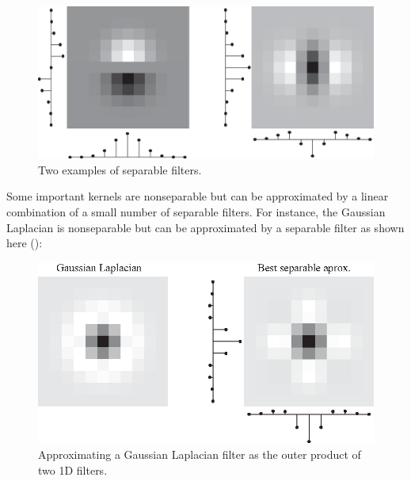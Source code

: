 \begin{figure}[h]
\centerline{
    \includegraphics[width=.6\linewidth]{./figures/convolutional_neural_nets/kernels_separable_aprox.eps}}
    \caption{Two examples of separable filters.}
    \label{fig:convolutional_neural_nets:kernels_separable_aprox}
\end{figure}
\vspace{-0.4cm}

Some important kernels are nonseparable but can be approximated by a linear combination of a small number of separable filters. For instance, the Gaussian Laplacian is nonseparable but can be approximated by a separable filter as shown here (\fig{\ref{fig:convolutional_neural_nets:laplacian_separable_aprox}}):
\begin{figure}[h]
\centerline{
    \includegraphics[width=.6\linewidth]{./figures/convolutional_neural_nets/laplacian_separable_aprox.eps}}
    \caption{Approximating a Gaussian Laplacian filter as the outer product of two 1D filters.}
    \label{fig:convolutional_neural_nets:laplacian_separable_aprox}
\end{figure}
\vspace{-0.4cm}

